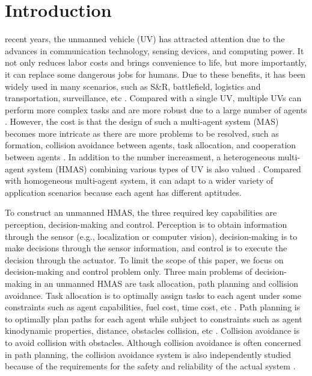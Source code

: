 \documentclass{ieeeaccess}
\begin{document}
\section{Introduction}
 recent years, the unmanned vehicle (UV) has attracted attention due to the advances in communication technology, sensing devices, and computing power. It not only reduces labor costs and brings convenience to life, but more importantly, it can replace some dangerous jobs for humans. Due to these benefits, it has been widely used in many scenarios, such as S\&R, battlefield, logistics and transportation, surveillance, etc \cite{9700861}. Compared with a single UV, multiple UVs can perform more complex tasks and are more robust due to a large number of agents \cite{8352646}. However, the cost is that the design of such a multi-agent system (MAS) becomes more intricate as there are more problems to be resolved, such as formation, collision avoidance between agents, task allocation, and cooperation between agents \cite{chen2019control}. In addition to the number increasment, a heterogeneous multi-agent system (HMAS) combining various types of UV is also valued \cite{9371292}. Compared with homogeneous multi-agent system, it can adapt to a wider variety of application scenarios because each agent has different aptitudes.

To construct an unmanned HMAS, the three required key capabilities are perception, decision-making and control. Perception is to obtain information through the sensor (e.g., localization or computer vision), decision-making is to make decisions through the sensor information, and control is to execute the decision through the actuator. To limit the scope of this paper, we focus on decision-making and control problem only. Three main problems of decision-making in an unmanned HMAS are task allocation, path planning and collision avoidance. Task allocation is to optimally assign tasks to each agent under some constraints such as agent capabilities, fuel cost, time cost, etc \cite{9476736}. Path planning is to optimally plan paths for each agent while subject to constraints such as agent kinodynamic properties, distance, obstacles collision, etc \cite{zhang2018path}. Collision avoidance is to avoid collision with obstacles. Although collision avoidance is often concerned in path planning, the collision avoidance system is also independently studied because of the requirements for the safety and reliability of the actual system \cite{9108245}.
\end{document}
